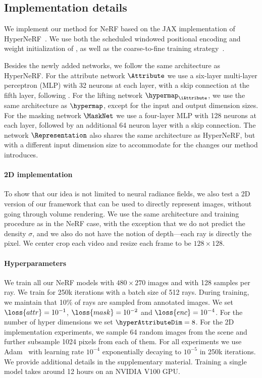   \subsection{Implementation details}
    We implement our method for NeRF based on the JAX \cite{jax2018github}
    implementation of HyperNeRF~\cite{park2021hypernerf}.
    We use both the scheduled windowed positional encoding and weight
    initialization of \cite{park2020deformable}, as well as the coarse-to-fine
    training strategy~\cite{park2021hypernerf}.

    Besides the newly added networks, we follow the same architecture as
    HyperNeRF.
    For the attribute network $\Attribute$ we use a six-layer multi-layer
    perceptron (MLP) with 32 neurons at each layer, with a skip connection at
    the fifth layer, following \cite{park2020deformable,park2021hypernerf}.
    For the lifting network $\hypermap_\iAttribute$, we use the same
    architecture as $\hypermap$, except for the input and output dimension
    sizes.
    For the masking network $\MaskNet$ we use a four-layer MLP with 128
    neurons at each layer, followed by an additional 64 neuron layer with a
    skip connection.
    The network $\Representation$ also shares the same architecture as
    HyperNeRF, but with a different input dimension size to accommodate for
    the changes our method introduces.

    \paragraph{2D implementation}
      To show that our idea is not limited to neural radiance fields, we also
      test a 2D version of our framework that can be used to directly
      represent images, without going through volume rendering.
      We use the same architecture and training procedure as in the NeRF case,
      with the exception that we do not predict the density $\sigma$, and we
      also do not have the notion of depth---each ray is directly the pixel.
      We center crop each video and resize each frame to be $128\times128$.

    \paragraph{Hyperparameters}
      We train all our NeRF models with $480\times270$ images and with 128
      samples per ray.
      We train for 250k iterations with a batch size of 512 rays.
      During training, we maintain that 10\% of rays are sampled from
      annotated images.
      We set $\loss{attr}=10^{-1}$, $\loss{mask}=10^{-2}$ and
      $\loss{enc}=10^{-4}$.
      For the number of hyper dimensions we set $\hyperAttributeDim = 8$.
      For the 2D implementation experiments, we sample 64 random images from
      the scene and further subsample 1024 pixels from each of them.
      For all experiments we use Adam~\cite{kingma2014adam} with learning rate
      $10^{-4}$ exponentially decaying to $10^{-5}$ in 250k iterations.
      We provide additional details in the supplementary material.
      Training a single model takes around 12 hours on an NVIDIA V100 GPU.
